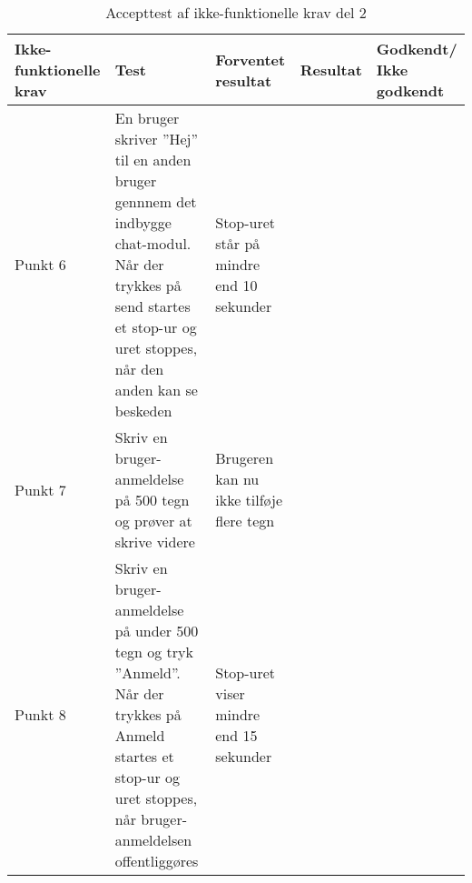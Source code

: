 	\setlength{\arrayrulewidth}{0.3mm}
	\setlength{\tabcolsep}{16pt}
	\renewcommand{\arraystretch}{1.5}
	\begin{table}[H]
		\begin{tabular}{ |p{2.3cm}|p{2.2cm}|p{2.2cm}|p{2.2cm}|p{2.2cm}| } 
			\hline
			\textbf{Ikke-funktionelle krav} & \textbf{Test} & \textbf{Forventet resultat} & \textbf{Resultat} & \textbf{Godkendt/ Ikke godkendt} \\
			\hline
		Punkt 6 & En bruger skriver ''Hej'' til en anden bruger gennnem det indbygge chat-modul. Når der trykkes på send startes et stop-ur og uret stoppes, når den anden kan se beskeden & Stop-uret står på mindre end 10 sekunder & &  \\
		\hline
		Punkt 7 & Skriv en bruger-anmeldelse på 500 tegn og prøver at skrive videre & Brugeren kan nu ikke tilføje flere tegn &  & \\
		\hline
		Punkt 8 & Skriv en bruger-anmeldelse på under 500 tegn og tryk ''Anmeld''. Når der trykkes på Anmeld startes et stop-ur og uret stoppes, når bruger-anmeldelsen offentliggøres & Stop-uret viser mindre end 15 sekunder &  & \\
		\hline
	\end{tabular}
	\caption{Accepttest af ikke-funktionelle krav del 2}
	\label{table:accepttest_ifk2}
\end{table}


